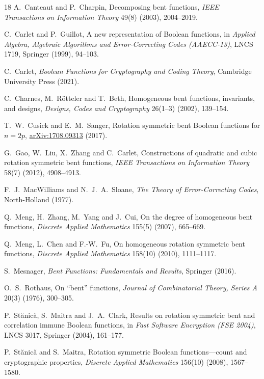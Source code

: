\documentclass[11pt,a4paper]{article}
\theoremstyle{definition}
\begin{document}
\begin{thebibliography}{18}
A.~Canteaut and P.~Charpin, Decomposing bent functions, \emph{IEEE Transactions on Information Theory} 49(8) (2003), 2004--2019.

C.~Carlet and P.~Guillot, A new representation of Boolean functions, in \emph{Applied Algebra, Algebraic Algorithms and Error-Correcting Codes (AAECC-13)}, LNCS 1719, Springer (1999), 94--103.

C.~Carlet, \emph{Boolean Functions for Cryptography and Coding Theory}, Cambridge University Press (2021).

C.~Charnes, M.~R\"otteler and T.~Beth, Homogeneous bent functions, invariants, and designs, \emph{Designs, Codes and Cryptography} 26(1--3) (2002), 139--154.

T.~W.~Cusick and E.~M.~Sanger, Rotation symmetric bent Boolean functions for $n=2p$, \href{https://arxiv.org/abs/1708.09313}{arXiv:1708.09313} (2017).

G.~Gao, W.~Liu, X.~Zhang and C.~Carlet, Constructions of quadratic and cubic rotation symmetric bent functions, \emph{IEEE Transactions on Information Theory} 58(7) (2012), 4908--4913.

F.~J.~MacWilliams and N.~J.~A.~Sloane, \emph{The Theory of Error-Correcting Codes}, North-Holland (1977).

Q.~Meng, H.~Zhang, M.~Yang and J.~Cui, On the degree of homogeneous bent functions, \emph{Discrete Applied Mathematics} 155(5) (2007), 665--669.

Q.~Meng, L.~Chen and F.-W.~Fu, On homogeneous rotation symmetric bent functions, \emph{Discrete Applied Mathematics} 158(10) (2010), 1111--1117.

S.~Mesnager, \emph{Bent Functions: Fundamentals and Results}, Springer (2016).

O.~S.~Rothaus, On ``bent'' functions, \emph{Journal of Combinatorial Theory, Series A} 20(3) (1976), 300--305.

P.~St\u{a}nic\u{a}, S.~Maitra and J.~A.~Clark, Results on rotation symmetric bent and correlation immune Boolean functions, in \emph{Fast Software Encryption (FSE 2004)}, LNCS 3017, Springer (2004), 161--177.

P.~St\u{a}nic\u{a} and S.~Maitra, Rotation symmetric Boolean functions---count and cryptographic properties, \emph{Discrete Applied Mathematics} 156(10) (2008), 1567--1580.


\end{thebibliography}
\end{document}
